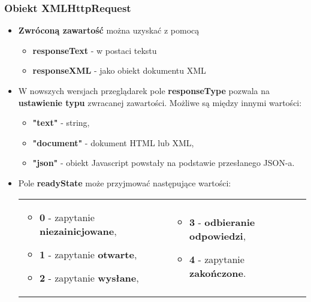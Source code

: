 \documentclass[../main.tex]{subfiles}
\begin{document}
    \subsubsection{Obiekt XMLHttpRequest}
    \begin{itemize}
        \item \textbf{Zwróconą zawartość} można uzyskać z pomocą
        \begin{itemize}
            \item \textbf{responseText} - w postaci tekstu
            \item \textbf{responseXML} - jako obiekt dokumentu XML
        \end{itemize}
        \item W nowszych wersjach przeglądarek pole \textbf{responseType} pozwala na
        \textbf{ustawienie typu} zwracanej zawartości. Możliwe są między innymi wartości:
        \begin{itemize}
            \item \textbf{"text"} - string,
            \item \textbf{"document"} - dokument HTML lub XML,
            \item \textbf{"json"} - obiekt Javascript powstały na podstawie przesłanego JSON-a.
        \end{itemize}
        \item Pole \textbf{readyState} może przyjmować następujące wartości:
        \begin{table}[H]
            \begin{center}
                \begin{tabular}{p{8cm} p{8cm}}
                    \begin{itemize}
                        \item \textbf{0} - zapytanie \textbf{niezainicjowane},
                        \item \textbf{1} - zapytanie \textbf{otwarte},
                        \item \textbf{2} - zapytanie \textbf{wysłane},
                    \end{itemize}
                    &
                    \begin{itemize}
                        \item \textbf{3} - \textbf{odbieranie odpowiedzi},
                        \item \textbf{4} - zapytanie \textbf{zakończone}.
                    \end{itemize}
                \end{tabular}

\end{center}
\end{table}
\end{itemize}
\end{document}

